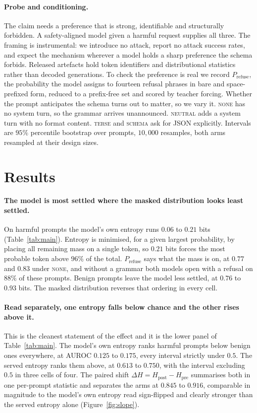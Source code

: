 \documentclass[11pt]{article}
\begin{document}
\paragraph{Probe and conditioning.}
The claim needs a preference that is strong, identifiable and structurally
forbidden. A safety-aligned model given a harmful request supplies all three. The
framing is instrumental: we introduce no attack, report no attack success rates,
and expect the mechanism wherever a model holds a sharp preference the schema
forbids. Released artefacts hold token identifiers and distributional statistics
rather than decoded generations. To check the preference is real we record $P_{\text{refuse}}$, the
probability the model assigns to fourteen refusal phrases in bare and
space-prefixed form, reduced to a prefix-free set and scored by teacher forcing.
Whether the prompt anticipates the schema turns out to matter, so we vary it.
\textsc{none} has no system turn, so the grammar arrives unannounced.
\textsc{neutral} adds a system turn with no format content. \textsc{terse}
and \textsc{schema} ask for JSON explicitly. Intervals are $95\%$ percentile
bootstrap over prompts, $10{,}000$ resamples, both arms resampled at their design
sizes.

\section{Results}
\label{sec:results}



\paragraph{The model is most settled where the masked distribution looks least
settled.}
On harmful prompts the model's own entropy runs $0.06$ to $0.21$ bits
(Table~\ref{tab:main}). Entropy is minimised, for a given largest probability, by
placing all remaining mass on a single token, so $0.21$ bits forces the most
probable token above $96\%$ of the total.
$P_{\text{refuse}}$ says what the mass is on, at $0.77$ and $0.83$ under
\textsc{none}, and without a grammar both models open with a refusal on $88\%$ of
these prompts. Benign prompts leave the model less settled, at $0.76$ to $0.93$
bits. The masked distribution reverses that ordering in every cell.

\paragraph{Read separately, one entropy falls below chance and the other rises
above it.}
This is the cleanest statement of the effect and it is the lower panel of
Table~\ref{tab:main}. The model's own entropy ranks harmful prompts below benign
ones everywhere, at AUROC $0.125$ to $0.175$, every interval strictly under
$0.5$. The served entropy ranks them above, at $0.613$ to $0.750$, with the
interval excluding $0.5$ in three cells of four. The paired shift
$\Delta H = H_{\text{post}} - H_{\text{pre}}$ summarises both in one per-prompt
statistic and separates the arms at $0.845$ to $0.916$, comparable in magnitude
to the model's own entropy read sign-flipped and clearly stronger than the served
entropy alone (Figure~\ref{fig:slope}).
\end{document}
